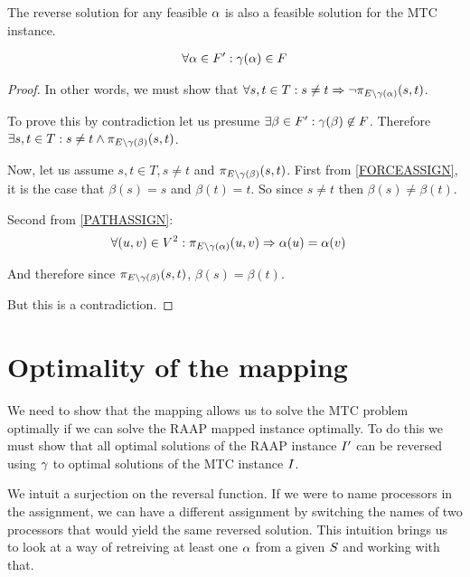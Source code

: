 \begin{lemma}
\label{REVERSEFEASABLE}
The reverse solution for any feasible $\alpha$ is also a feasible solution for the MTC instance.

\begin{align}
	\nonumber \forall \alpha \in F' : \gamma(\alpha) \in F
\end{align}
\end{lemma}
\begin{proof}
In other words, we must show that $\forall s, t \in T : s \neq t \Rightarrow \neg\pi_{E \setminus \gamma(\alpha)}(s, t)$.

To prove this by contradiction let us presume $\exists \beta \in F' : \gamma(\beta) \not\in F$.
Therefore $\exists s, t \in T : s \neq t \wedge \pi_{E \setminus \gamma(\beta)}(s, t)$.

Now, let us assume $s, t \in T, s \neq t$ and $\pi_{E \setminus \gamma(\beta)}(s, t)$.
First from \ref{FORCEASSIGN}, it is the case that $\beta(s) = s$ and $\beta(t) = t$.
So since $s \neq t$ then $\beta(s) \neq \beta(t)$.

Second from \ref{PATHASSIGN}:
\begin{align}
	\nonumber \forall (u, v) \in V^2 : \pi_{E \setminus \gamma(\alpha)}(u, v) & \Rightarrow \alpha(u) = \alpha(v)
\end{align}

And therefore since $\pi_{E \setminus \gamma(\beta)}(s, t)$, $\beta(s) = \beta(t)$.

But this is a contradiction.
\end{proof}

\section{Optimality of the mapping}
\label{secHardOpt}

We need to show that the mapping allows us to solve the MTC problem optimally if we can solve the RAAP mapped instance optimally.
To do this we must show that all optimal solutions of the RAAP instance $I'$ can be reversed using $\gamma$ to optimal solutions of the MTC instance $I$.

We intuit a surjection on the reversal function.
If we were to name processors in the assignment, we can have a different assignment by switching the names of two processors that would yield the same reversed solution.
This intuition brings us to look at a way of retreiving at least one $\alpha$ from a given $S$ and working with that.

